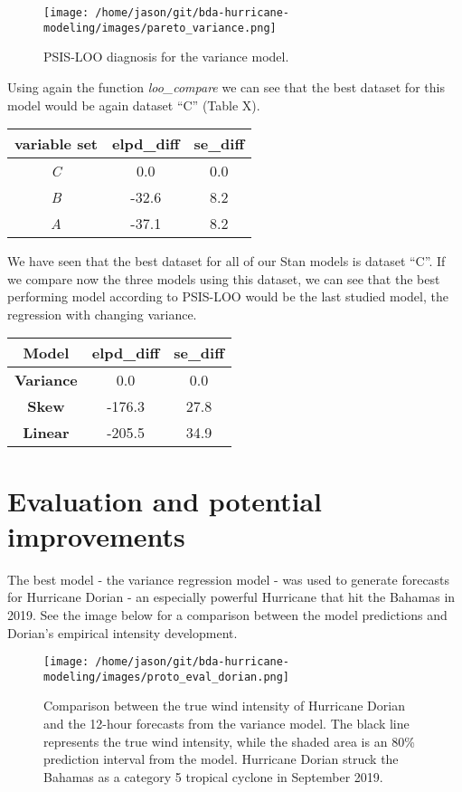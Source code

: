 \documentclass[
]{article}
\begin{document}
\begin{figure}
\centering
\texttt{[image: /home/jason/git/bda-hurricane-modeling/images/pareto\_variance.png]}
\caption{PSIS-LOO diagnosis for the variance model.}
\end{figure}

Using again the function \emph{loo\_compare} we can see that the best
dataset for this model would be again dataset ``C'' (Table X).

\begin{longtable}[]{@{}ccc@{}}
\toprule
variable set & \textbf{elpd\_diff} & \textbf{se\_diff}\tabularnewline
\midrule
\endhead
\emph{C} & 0.0 & 0.0\tabularnewline
\emph{B} & -32.6 & 8.2\tabularnewline
\emph{A} & -37.1 & 8.2\tabularnewline
\bottomrule
\end{longtable}

We have seen that the best dataset for all of our Stan models is dataset
``C''. If we compare now the three models using this dataset, we can see
that the best performing model according to PSIS-LOO would be the last
studied model, the regression with changing variance.

\begin{longtable}[]{@{}ccc@{}}
\toprule
Model & \textbf{elpd\_diff} & \textbf{se\_diff}\tabularnewline
\midrule
\endhead
\textbf{Variance} & 0.0 & 0.0\tabularnewline
\textbf{Skew} & -176.3 & 27.8\tabularnewline
\textbf{Linear} & -205.5 & 34.9\tabularnewline
\bottomrule
\end{longtable}

\newpage

\hypertarget{evaluation-and-potential-improvements}{%
\section{Evaluation and potential
improvements}\label{evaluation-and-potential-improvements}}

The best model - the variance regression model - was used to generate
forecasts for Hurricane Dorian - an especially powerful Hurricane that
hit the Bahamas in 2019. See the image below for a comparison between
the model predictions and Dorian's empirical intensity development.

\begin{figure}
\centering
\texttt{[image: /home/jason/git/bda-hurricane-modeling/images/proto\_eval\_dorian.png]}
\caption{Comparison between the true wind intensity of Hurricane Dorian
and the 12-hour forecasts from the variance model. The black line
represents the true wind intensity, while the shaded area is an 80\%
prediction interval from the model. Hurricane Dorian struck the Bahamas
as a category 5 tropical cyclone in September 2019.}
\end{figure}
\end{document}
